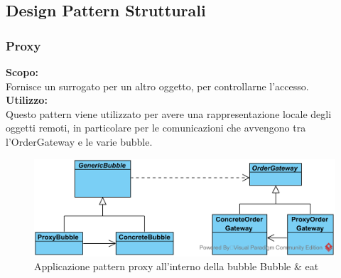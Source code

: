 \subsection{Design Pattern Strutturali}

%

\subsubsection{Proxy}
\textbf{Scopo:}\\
Fornisce un surrogato per un altro oggetto, per controllarne l'accesso.\\
\textbf{Utilizzo:}\\
Questo pattern viene utilizzato per avere una rappresentazione locale degli oggetti remoti, in particolare per le comunicazioni che avvengono tra l'OrderGateway e le varie bubble.

\begin{figure}[H]
	\centering
	\includegraphics[width=15cm]{./diagrammi_img/applicazione_pattern/proxy_demo.png}
	\caption{Applicazione pattern proxy all'interno della bubble Bubble \& eat}
\end{figure}

